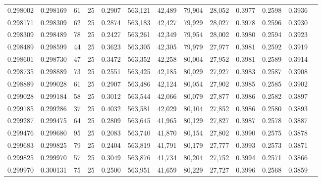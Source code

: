 \begin{tabular}{rrrrrrrrrrrrr}
0.298002 & 0.298169 &    61 &  25 &                                     0.2907 & 563,121 &  42,489 &  79,904 &  28,052 & 0.3977 & 0.2598 & 0.3936 \\
0.298171 & 0.298309 &    62 &  25 &                                     0.2874 & 563,183 &  42,427 &  79,929 &  28,027 & 0.3978 & 0.2596 & 0.3930 \\
0.298309 & 0.298489 &    78 &  25 &                                     0.2427 & 563,261 &  42,349 &  79,954 &  28,002 & 0.3980 & 0.2594 & 0.3923 \\
0.298489 & 0.298599 &    44 &  25 &                                     0.3623 & 563,305 &  42,305 &  79,979 &  27,977 & 0.3981 & 0.2592 & 0.3919 \\
0.298601 & 0.298730 &    47 &  25 &                                     0.3472 & 563,352 &  42,258 &  80,004 &  27,952 & 0.3981 & 0.2589 & 0.3914 \\
0.298735 & 0.298889 &    73 &  25 &                                     0.2551 & 563,425 &  42,185 &  80,029 &  27,927 & 0.3983 & 0.2587 & 0.3908 \\
0.298889 & 0.299028 &    61 &  25 &                                     0.2907 & 563,486 &  42,124 &  80,054 &  27,902 & 0.3985 & 0.2585 & 0.3902 \\
0.299028 & 0.299184 &    58 &  25 &                                     0.3012 & 563,544 &  42,066 &  80,079 &  27,877 & 0.3986 & 0.2582 & 0.3897 \\
0.299185 & 0.299286 &    37 &  25 &                                     0.4032 & 563,581 &  42,029 &  80,104 &  27,852 & 0.3986 & 0.2580 & 0.3893 \\
0.299287 & 0.299475 &    64 &  25 &                                     0.2809 & 563,645 &  41,965 &  80,129 &  27,827 & 0.3987 & 0.2578 & 0.3887 \\
0.299476 & 0.299680 &    95 &  25 &                                     0.2083 & 563,740 &  41,870 &  80,154 &  27,802 & 0.3990 & 0.2575 & 0.3878 \\
0.299683 & 0.299825 &    79 &  25 &                                     0.2404 & 563,819 &  41,791 &  80,179 &  27,777 & 0.3993 & 0.2573 & 0.3871 \\
0.299825 & 0.299970 &    57 &  25 &                                     0.3049 & 563,876 &  41,734 &  80,204 &  27,752 & 0.3994 & 0.2571 & 0.3866 \\
0.299970 & 0.300131 &    75 &  25 &                                     0.2500 & 563,951 &  41,659 &  80,229 &  27,727 & 0.3996 & 0.2568 & 0.3859 \\

\end{tabular}
